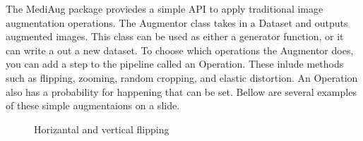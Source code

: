 \documentclass[ms,electronic,oneside,twosidetoc,letterpaper,chaptercenter,parttop]{byumsphd}
\begin{document}
The MediAug package proviedes a simple API to apply traditional image augmentation operations.
The Augmentor class takes in a Dataset and outputs augmented images. This class can be used
as either a generator function, or it can write a out a new dataset. To choose which operations 
the Augmentor does, you can add a step to the pipeline called an Operation. These inlude methods
such as flipping, zooming, random cropping, and elastic distortion. An Operation also has a probability
for happening that can be set. Bellow are several examples of these simple augmentaions on a slide.

\begin{figure}[H]
  \centering
   \quad
   \quad
   \quad
   \quad
  \caption{Horizantal and vertical flipping}
\end{figure}
\end{document}
